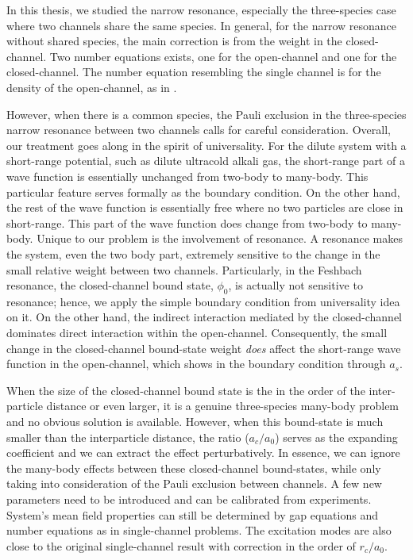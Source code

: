 % 
In this thesis, we studied the narrow resonance, especially the three-species case where two channels share the same species.  In general, for the narrow resonance without shared species, the main correction is from the weight in the closed-channel.  Two number equations exists, one for the open-channel and one for the closed-channel.  The number equation resembling the single channel is for the density of the open-channel, as in  \cite{GurarieNarrow}.  

However, when there is a common species,  the Pauli exclusion in the three-species narrow resonance between two channels calls for careful  consideration.  Overall, our treatment goes along in the spirit of universality.  For the dilute system with a short-range potential, such as dilute ultracold alkali gas, the short-range part of a wave function is essentially unchanged from two-body  to many-body.  This particular feature serves formally as the boundary condition.  On the other hand, the rest of the wave function is essentially free where no two particles are close in short-range. This part of the wave function does change from two-body to many-body.  Unique to our problem is the involvement of resonance.  A resonance makes the system, even the two body part, extremely sensitive to the change in the small relative weight between two channels. Particularly, in the Feshbach resonance, the closed-channel bound state, $\phi_{0}$,  is actually not sensitive to resonance; hence, we apply the simple boundary condition from universality idea on it. On the other hand, the indirect interaction mediated by the closed-channel dominates direct interaction within the open-channel. Consequently, the small change in the closed-channel bound-state weight \emph{does} affect the short-range wave function in the open-channel, which shows in the boundary condition through $a_{s}$. 

When the size of  the closed-channel bound state is the in the order of the   inter-particle distance or even larger, it is a genuine three-species many-body problem and no obvious solution is available.  However, when this bound-state is much smaller than the interparticle distance, the ratio ($a_{c}/a_{0}$) serves as the expanding coefficient and we can extract  the effect perturbatively.  In essence, we can ignore the many-body effects between these closed-channel bound-states, while only taking into consideration of the Pauli exclusion between channels.  A few new parameters need to be introduced and can be calibrated from experiments.  System's mean field properties can still be determined by gap equations and number equations as in single-channel problems.  The excitation modes are also close to the original single-channel result with correction in the order of $r_{c}/a_{0}$.

